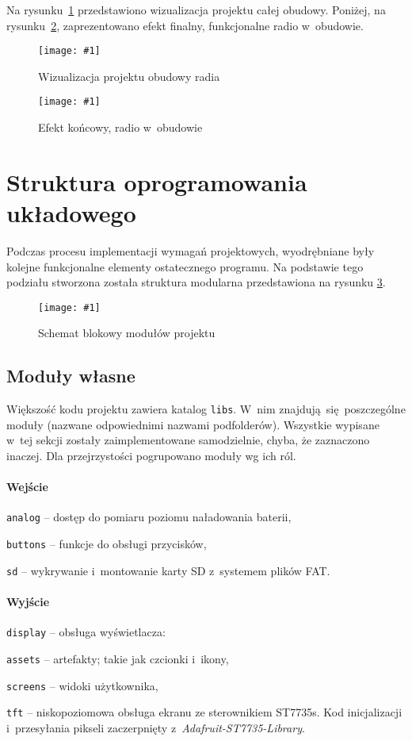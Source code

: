 \documentclass[polish]{aghengthesis}
\let\tempone\itemize
\let\temptwo\enditemize
\renewenvironment{itemize}{\tempone\setlength{\itemsep}{0cm}}{\temptwo}
\newcommand{\imgint}[4]{
	\begin{figure}[{#4}]
		\centering
		\texttt{[image: \#1]}
		\caption{#2}
		\label{#1}
	\end{figure}
}
\newcommand{\imgh}[3]{\imgint{#1}{#2}{#3}{H}}
\newcommand{\lstfile}[3]{
	\noindent
	\hspace{0.1\linewidth}
	\begin{minipage}{0.8\linewidth}
		
	\end{minipage}
	\vspace{0.3cm}
}
\begin{document}
			\lstfile{scad}{Kod generujący otwory na przyciski i~śruby montażowe}{lst/3/buttons.scad}
			\pagebreak
			
			Na rysunku~\ref{3/hw_scad_case} przedstawiono wizualizacja projektu całej obudowy. Poniżej, na rysunku~\ref{3/hw_case}, zaprezentowano efekt finalny, funkcjonalne radio w~obudowie.
			\imgh{3/hw_scad_case}{Wizualizacja projektu obudowy radia}{0.8}
			\imgh{3/hw_case}{Efekt końcowy, radio w~obudowie}{0.8}
			\pagebreak
	
	\section{Struktura oprogramowania układowego}
		Podczas procesu implementacji wymagań projektowych, wyodrębniane były kolejne funkcjonalne elementy ostatecznego programu.
		Na podstawie tego podziału stworzona została struktura modularna przedstawiona na rysunku \ref{3/PicoRadio-code-block-diagram}.
		\imgh{3/PicoRadio-code-block-diagram}{Schemat blokowy modułów projektu}{0.75}
		
		\subsection{Moduły własne}
			Większość kodu projektu zawiera katalog \lstinline|libs|. W~nim znajdują się poszczególne moduły (nazwane odpowiednimi nazwami podfolderów). Wszystkie wypisane w~tej sekcji zostały zaimplementowane samodzielnie, chyba, że zaznaczono inaczej. Dla przejrzystości pogrupowano moduły wg ich ról.
		
			\paragraph{Wejście}
				\begin{itemize}
					\item \lstinline|analog| -- dostęp do pomiaru poziomu naładowania baterii,
					\item \lstinline|buttons| -- funkcje do obsługi przycisków,
					\item \lstinline|sd| -- wykrywanie i~montowanie karty SD z~systemem plików FAT.
				\end{itemize}
			\pagebreak
			
			\paragraph{Wyjście}
				\begin{itemize}
					\item \lstinline|display| -- obsługa wyświetlacza:
					\begin{itemize}
						\item \lstinline|assets| -- artefakty; takie jak czcionki i~ikony,
						\item \lstinline|screens| -- widoki użytkownika,
						\item \lstinline|tft| -- niskopoziomowa obsługa ekranu ze sterownikiem ST7735s. Kod inicjalizacji i~przesyłania pikseli zaczerpnięty z~\textit{Adafruit-ST7735-Library}\textsuperscript{\cite{adafruit_st7735}}.
					\end{itemize}
				\end{itemize}
			
\end{document}
